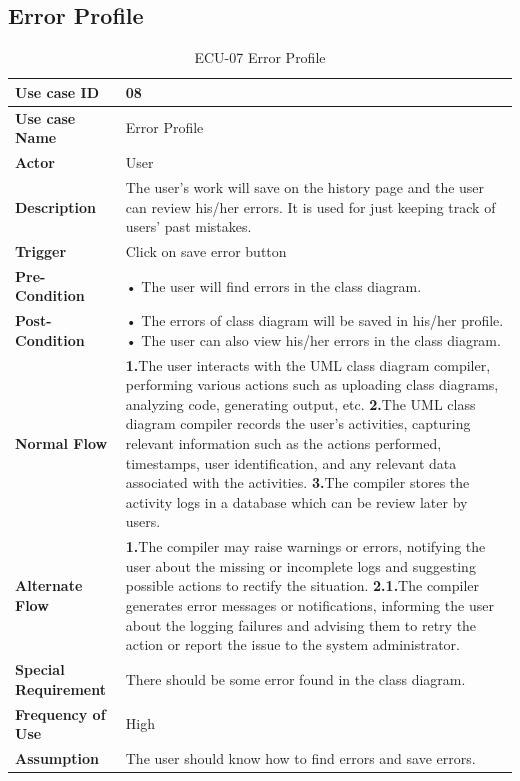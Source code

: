 \documentclass[12pt,a4paper]{article}
\begin{document}
\clearpage
     \subsection{Error Profile}
    \begin{table}[h!]
\caption{ECU-07 Error Profile}
    \centering
    \begin{tabular}{|l|p{10cm}|}
    \hline
       \textbf{Use case ID}&08 \\ %
       \hline
       \textbf{Use case Name}&Error Profile \\ %
       \hline
       \textbf{Actor}&User \\ %
       \hline
       \textbf{Description}&The user’s work will save on the history page and the user can review his/her errors. It is used for just keeping track of users’ past mistakes.\\ %
        \hline
       \textbf{Trigger}&Click on save error button  \\ %
        \hline
       \textbf{Pre-Condition}&
• The user will find errors in the class diagram.
\\ %
        \hline
       \textbf{Post-Condition}&• The errors of class diagram will be saved in his/her profile.
       \newline• The user can also view his/her errors in the class diagram.
 \\ %
        \hline
       \textbf{Normal Flow}&
    \textbf{1.}The user interacts with the UML class diagram compiler, performing various actions such as uploading class diagrams, analyzing code, generating output, etc.
\newline\textbf{2.}The UML class diagram compiler records the user's activities, capturing relevant information such as the actions performed, timestamps, user identification, and any relevant data associated with the activities.
\newline\textbf{3.}The compiler stores the activity logs in a database which can be review later by users.\\ %
\hline
       \textbf{Alternate Flow}&
       \textbf{1.}The compiler may raise warnings or errors, notifying the user about the missing or incomplete logs and suggesting possible actions to rectify the situation.
       \newline\textbf{2.1.}The compiler generates error messages or notifications, informing the user about the logging failures and advising them to retry the action or report the issue to the system administrator.\\ %
        \hline
       \textbf{Special Requirement}&There should be some error found in the class diagram. \\ %
        \hline
       \textbf{Frequency of Use}&High \\ %
        \hline
       \textbf{Assumption}&The user should know how to find errors and save errors. \\ %
       \hline
    \end{tabular} 
    \end{table}
\end{document}
